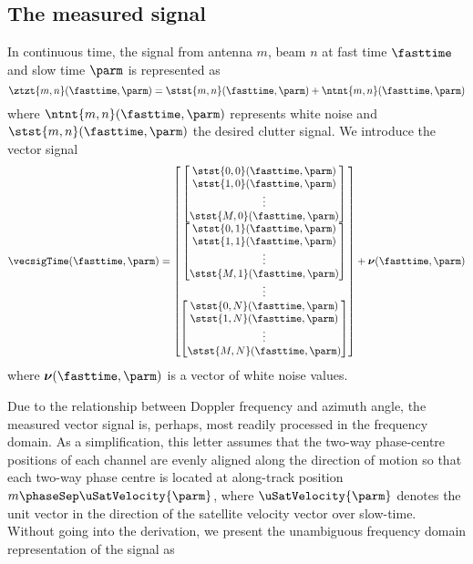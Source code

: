 \subsection{The measured signal}
In continuous time, the signal from antenna $m$, beam $n$ at fast time $\fasttime$ and slow time $\parm$ is represented as
\begin{equation}
 \ztzt{m,n}(\fasttime, \parm)=\stst{m,n}(\fasttime, \parm) + \ntnt{m,n}(\fasttime, \parm)
\end{equation}
where $\ntnt{m,n}(\fasttime, \parm)$ represents white noise and $\stst{m,n}(\fasttime, \parm)$ the desired clutter signal. We introduce the vector signal
\begin{equation}
 \vecsigTime(\fasttime, \parm) = 
 \begin{bmatrix}
 \begin{bmatrix}
 \stst{0,0}(\fasttime, \parm)\\
 \stst{1,0}(\fasttime, \parm)\\
 \vdots\\
 \stst{M,0}(\fasttime, \parm)
 \end{bmatrix}\\
 \begin{bmatrix}
 \stst{0,1}(\fasttime, \parm)\\
 \stst{1,1}(\fasttime, \parm)\\
 \vdots\\
 \stst{M,1}(\fasttime, \parm)
 \end{bmatrix}\\
 \vdots\\
 \begin{bmatrix}
 \stst{0,N}(\fasttime, \parm)\\
 \stst{1,N}(\fasttime, \parm)\\
 \vdots\\
 \stst{M, N}(\fasttime, \parm)
 \end{bmatrix}
 \end{bmatrix}
 +
 \boldsymbol{\nu}(\fasttime, \parm)
\end{equation}
where $\boldsymbol{\nu}(\fasttime, \parm)$ is a vector of white noise values.
\par
Due to the relationship between Doppler frequency and azimuth angle, the measured vector signal is, perhaps, most readily processed in the frequency domain. As a simplification, this letter assumes that the two-way phase-centre positions of each channel are evenly aligned along the direction of motion so that each two-way phase centre is located at along-track position $m\phaseSep\uSatVelocity{\parm}$, where $\uSatVelocity{\parm}$ denotes the unit vector in the direction of the satellite velocity vector over slow-time. Without going into the derivation, we present the unambiguous frequency domain representation of the signal as
